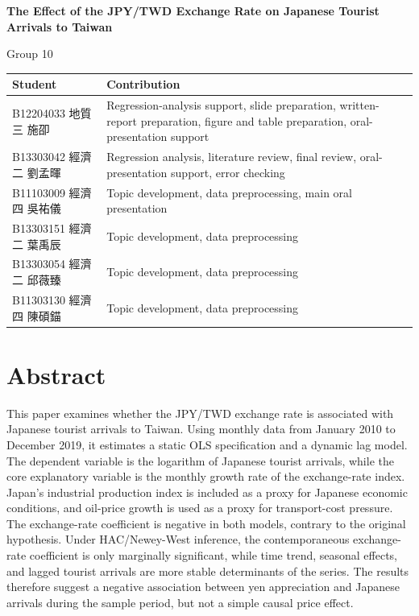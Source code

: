 \documentclass[12pt]{article}
\begin{document}


\begin{center}
{\LARGE \textbf{The Effect of the JPY/TWD Exchange Rate on Japanese Tourist Arrivals to Taiwan}\par}
\vspace{0.35em}
{\normalsize Group 10\par}
\vspace{0.8em}
\small
\begin{tabularx}{0.96\textwidth}{>{\raggedright\arraybackslash}p{} >{\raggedright\arraybackslash}X}
\toprule
\textbf{Student} & \textbf{Contribution} \\
\midrule
B12204033 地質三 施卲 & Regression-analysis support, slide preparation, written-report preparation, figure and table preparation, oral-presentation support \\
B13303042 經濟二 劉孟暉 & Regression analysis, literature review, final review, oral-presentation support, error checking \\
B11103009 經濟四 吳祐儀 & Topic development, data preprocessing, main oral presentation \\
B13303151 經濟二 葉禹辰 & Topic development, data preprocessing \\
B13303054 經濟二 邱薇臻 & Topic development, data preprocessing \\
B11303130 經濟四 陳碩錨 & Topic development, data preprocessing \\
\bottomrule
\end{tabularx}
\vspace{0.8em}
\end{center}

\section*{Abstract}
This paper examines whether the JPY/TWD exchange rate is associated with Japanese tourist arrivals to Taiwan. Using monthly data from January 2010 to December 2019, it estimates a static OLS specification and a dynamic lag model. The dependent variable is the logarithm of Japanese tourist arrivals, while the core explanatory variable is the monthly growth rate of the exchange-rate index. Japan's industrial production index is included as a proxy for Japanese economic conditions, and oil-price growth is used as a proxy for transport-cost pressure. The exchange-rate coefficient is negative in both models, contrary to the original hypothesis. Under HAC/Newey-West inference, the contemporaneous exchange-rate coefficient is only marginally significant, while time trend, seasonal effects, and lagged tourist arrivals are more stable determinants of the series. The results therefore suggest a negative association between yen appreciation and Japanese arrivals during the sample period, but not a simple causal price effect.
\end{document}
